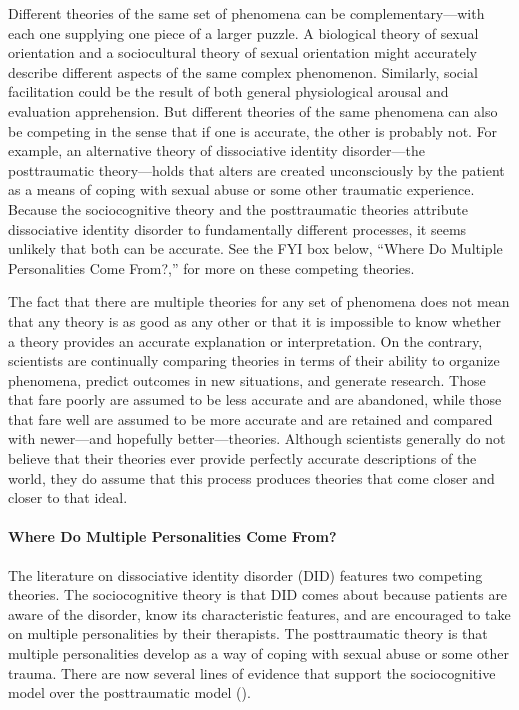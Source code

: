\documentclass[
]{krantz}
\begin{document}
Different theories of the same set of phenomena can be complementary---with each one supplying one piece of a larger puzzle. A biological theory of sexual orientation and a sociocultural theory of sexual orientation might accurately describe different aspects of the same complex phenomenon. Similarly, social facilitation could be the result of both general physiological arousal and evaluation apprehension. But different theories of the same phenomena can also be competing in the sense that if one is accurate, the other is probably not. For example, an alternative theory of dissociative identity disorder---the posttraumatic theory---holds that alters are created unconsciously by the patient as a means of coping with sexual abuse or some other traumatic experience. Because the sociocognitive theory and the posttraumatic theories attribute dissociative identity disorder to fundamentally different processes, it seems unlikely that both can be accurate. See the FYI box below, ``Where Do Multiple Personalities Come From?,'' for more on these competing theories.

The fact that there are multiple theories for any set of phenomena does not mean that any theory is as good as any other or that it is impossible to know whether a theory provides an accurate explanation or interpretation. On the contrary, scientists are continually comparing theories in terms of their ability to organize phenomena, predict outcomes in new situations, and generate research. Those that fare poorly are assumed to be less accurate and are abandoned, while those that fare well are assumed to be more accurate and are retained and compared with newer---and hopefully better---theories. Although scientists generally do not believe that their theories ever provide perfectly accurate descriptions of the world, they do assume that this process produces theories that come closer and closer to that ideal.

\paragraph*{Where Do Multiple Personalities Come From?}\label{where-do-multiple-personalities-come-from}

The literature on dissociative identity disorder (DID) features two competing theories. The sociocognitive theory is that DID comes about because patients are aware of the disorder, know its characteristic features, and are encouraged to take on multiple personalities by their therapists. The posttraumatic theory is that multiple personalities develop as a way of coping with sexual abuse or some other trauma. There are now several lines of evidence that support the sociocognitive model over the posttraumatic model ().
\end{document}
